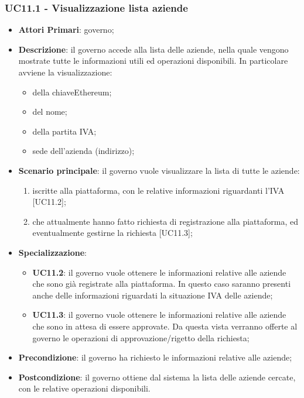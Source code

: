  \subsubsection{UC11.1 - Visualizzazione lista aziende}
 \begin{itemize}
 	\item \textbf{Attori Primari}: governo;
 	\item \textbf{Descrizione}: il governo accede alla lista delle aziende, nella quale vengono mostrate tutte le informazioni utili ed operazioni disponibili. In particolare avviene la visualizzazione:
 	\begin{itemize}
 		\item della chiave\glosp Ethereum;
 		\item del nome;
 		\item della partita IVA;
 		\item sede dell'azienda (indirizzo);
 	\end{itemize}
 	\item \textbf{Scenario principale}: il governo vuole visualizzare la lista di tutte le aziende:
 	\begin{enumerate}[label=\alph*.]
 		\item iscritte alla piattaforma, con le relative informazioni riguardanti l'IVA [UC11.2];
 		\item che attualmente hanno fatto richiesta di registrazione alla piattaforma, ed eventualmente gestirne la richiesta [UC11.3];
 	\end{enumerate}
	\item \textbf{Specializzazione}:
	\begin{itemize}
	 	\item \textbf{UC11.2}: il governo vuole ottenere le informazioni relative alle aziende che sono già registrate alla piattaforma. In questo caso saranno presenti anche delle informazioni riguardati la situazione IVA delle aziende;
	 	\item \textbf{UC11.3}: il governo vuole ottenere le informazioni relative alle aziende che sono in attesa di essere approvate. Da questa vista verranno offerte al governo le operazioni di approvazione/rigetto della richiesta;
	\end{itemize}
 	\item \textbf{Precondizione}: il governo ha richiesto le informazioni relative alle aziende;
 	\item \textbf{Postcondizione}: il governo ottiene dal sistema la lista delle aziende cercate, con le relative operazioni disponibili.
\end{itemize}
